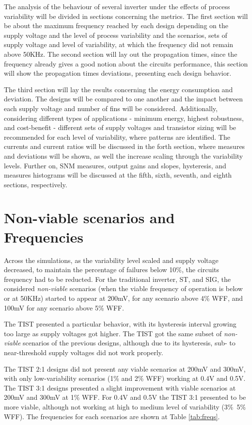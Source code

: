 \documentclass[pgmicro,diss,english]{iiufrgs}
\begin{document}
The analysis of the behaviour of several inverter under the effects of process variability will be divided in sections concerning the metrics. The first section will be about the maximum frequency reached by each design depending on the supply voltage and the level of process variability and the scenarios, sets of supply voltage and level of variability, at which the frequency did not remain above 50KHz. The second section will lay out the propagation times, since the frequency already gives a good notion about the circuits performance, this section will show the propagation times deviations, presenting each design behavior.

The third section will lay the results concerning the energy consumption and deviation. The designs will be compared to one another and the impact between each supply voltage and number of fins will be considered. Additionally, considering different types of applications - minimum energy, highest robustness, and cost-benefit - different sets of supply voltages and transistor sizing will be recommended for each level of variability, where patterns are identified. The currents and current ratios will be discussed in the forth section, where measures and deviations will be shown, as well the increase scaling through the variability levels. Further on, SNM measures, output gains and slopes, hysteresis, and measures histograms will be discussed at the fifth, sixth, seventh, and eighth sections, respectively.

\section{Non-viable scenarios and Frequencies}

Across the simulations, as the variability level scaled and supply voltage decreased, to maintain the percentage of failures below 10\%, the circuits frequency had to be reducted. For the traditional inverter, ST, and SIG, the considered \textit{non-viable} scenarios (when the viable frequency of operation is below or at 50KHz) started to appear at 200mV, for any scenario above 4\% WFF, and 100mV for any scenario above 5\% WFF.

The TIST presented a particular behavior, with its hysteresis interval growing too large as supply voltages got higher. The TIST got the same subset of \textit{non-viable} scenarios of the previous designs, although due to its hysteresis, sub- to near-threshold supply voltages did not work properly.

The TIST 2:1 designs did not present any viable scenarios at 200mV and 300mV, with only low-variability scenarios (1\% and 2\% WFF) working at 0.4V and 0.5V. The TIST 3:1 designs presented a slight improvement with viable scenarios at 200mV and 300mV at 1\% WFF. For 0.4V and 0.5V the TIST 3:1 presented to be more viable, although not working at high to medium level of variability (3\%~5\% WFF). The frequencies for each scenarios are shown at Table \ref{tab:freqs}.
\end{document}

